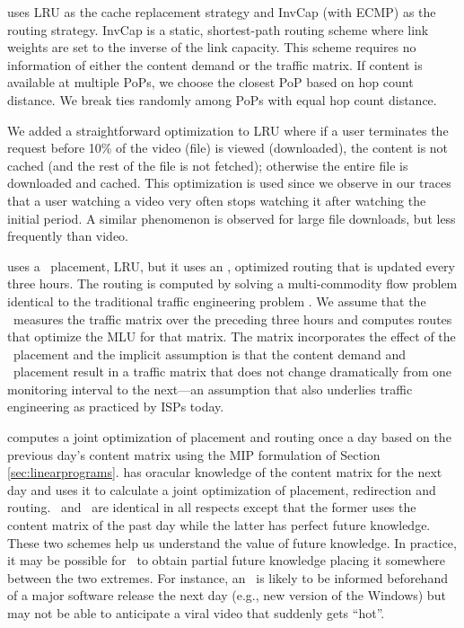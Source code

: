 \textbf{\invlru} uses LRU as the cache replacement strategy and InvCap  (with ECMP) as the routing strategy. InvCap is a static, shortest-path routing scheme where link weights are set to the inverse of the link capacity.  This scheme requires no information of either the content demand or the traffic matrix. If content is available at multiple PoPs, we choose the closest PoP based on hop count distance. We break  ties randomly among PoPs with equal hop count distance.
 
We added  a straightforward optimization to LRU where if a user terminates the request before 10\% of the video (file) is viewed (downloaded), the content is not cached (and the rest of the file is not fetched); otherwise the entire file is downloaded and cached. This optimization is used since we observe in our traces that a user watching a video very often stops watching it after watching the initial period. A similar phenomenon is observed for large file downloads, but less frequently than video.


 \textbf{\optlru} uses a \unplanned\  placement, LRU, but it uses an \planned, optimized routing that is updated  every three hours. The routing is computed by solving a multi-commodity flow problem 
 identical to  the traditional traffic engineering problem \cite{fortz2000internet}. We assume that the \ncp\ measures the traffic matrix over the preceding  three hours and computes routes that optimize the MLU for that matrix. The matrix incorporates the effect of the \unplanned\  placement and the implicit assumption is that the content demand and \unplanned\  placement result in a traffic matrix that does not change dramatically from one monitoring interval to the next---an assumption that also underlies traffic engineering as practiced by ISPs today. 
 


\textbf{\optrp} computes a joint optimization of placement and routing once a day based on the previous day's content matrix using the MIP formulation of Section \ref{sec:linearprograms}.  \textbf{\optrpfuture} has oracular knowledge of the content matrix for the next day and uses it to calculate a joint optimization of placement, redirection and routing.  \optrp\ and \optrpfuture\ are identical in all respects except that the former uses the content matrix of the past day while the latter has perfect future knowledge. These two schemes help us understand the value of future knowledge. In practice, it may be possible for \ancp\  to obtain partial future knowledge placing it somewhere between the two extremes. For instance, an \ncp\ is likely to be informed beforehand of a major software release the next day (e.g., new version of the Windows) but may not be able to anticipate a viral video that suddenly gets ``hot''.




